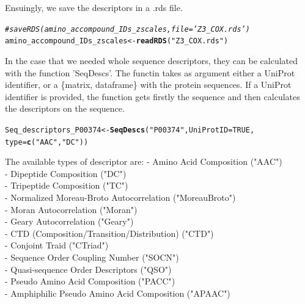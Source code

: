 \documentclass[twoside,a4wide,12pt]{article}\usepackage[]{graphicx}\usepackage[]{color}
\makeatletter
\newcommand{\hlnum}[1]{\textcolor[rgb]{0.686,0.059,0.569}{#1}}%
\newcommand{\hlstr}[1]{\textcolor[rgb]{0.192,0.494,0.8}{#1}}%
\newcommand{\hlcom}[1]{\textcolor[rgb]{0.678,0.584,0.686}{\textit{#1}}}%
\newcommand{\hlstd}[1]{\textcolor[rgb]{0.345,0.345,0.345}{#1}}%
\newcommand{\hlkwb}[1]{\textcolor[rgb]{0.69,0.353,0.396}{#1}}%
\newcommand{\hlkwc}[1]{\textcolor[rgb]{0.333,0.667,0.333}{#1}}%
\newcommand{\hlkwd}[1]{\textcolor[rgb]{0.737,0.353,0.396}{\textbf{#1}}}%
\newenvironment{kframe}{%
 \def\at@end@of@kframe{}%
 \ifinner\ifhmode%
  \def\at@end@of@kframe{\end{minipage}}%
  \begin{minipage}{\columnwidth}%
 \fi\fi%
 \def\FrameCommand##1{\hskip\@totalleftmargin \hskip-\fboxsep
 \colorbox{shadecolor}{##1}\hskip-\fboxsep
     \hskip-\linewidth \hskip-\@totalleftmargin \hskip\columnwidth}%
 \MakeFramed {\advance\hsize-\width
   \@totalleftmargin\z@ \linewidth\hsize
   \@setminipage}}%
 {\par\unskip\endMakeFramed%
 \at@end@of@kframe}
\newenvironment{knitrout}{}{} %
\makeatother
\begin{document}
Ensuingly, we save the descriptors in a .rds file.
\begin{knitrout}
\color{fgcolor}\begin{kframe}
\begin{alltt}
\hlcom{# saveRDS(amino_accompound_IDs_zscales,file='Z3_COX.rds')}
\hlstd{amino_accompound_IDs_zscales} \hlkwb{<-} \hlkwd{readRDS}\hlstd{(}\hlstr{"Z3_COX.rds"}\hlstd{)}
\end{alltt}
\end{kframe}
\end{knitrout}


In the case that we needed whole sequence descriptors, they can be calculated with the function 'SeqDescs'. The functin takes as argument either a UniProt identifier, or a \{matrix, dataframe\} with the protein sequences. If a UniProt identifier is provided, the function gets firstly the sequence and then calculates the descriptors on the sequence.

\begin{knitrout}
\color{fgcolor}\begin{kframe}
\begin{alltt}
\hlstd{Seq_descriptors_P00374} \hlkwb{<-} \hlkwd{SeqDescs}\hlstd{(}\hlstr{"P00374"}\hlstd{,} \hlkwc{UniProtID} \hlstd{=} \hlnum{TRUE}\hlstd{,}
    \hlkwc{type} \hlstd{=} \hlkwd{c}\hlstd{(}\hlstr{"AAC"}\hlstd{,} \hlstr{"DC"}\hlstd{))}
\end{alltt}
\end{kframe}
\end{knitrout}

The available types of descriptor are:\cite{protr}
- Amino Acid Composition ("AAC")\\
- Dipeptide Composition ("DC")\\
- Tripeptide Composition ("TC")\\
- Normalized Moreau-Broto Autocorrelation ("MoreauBroto")\\
- Moran Autocorrelation ("Moran")\\
- Geary Autocorrelation ("Geary")\\
- CTD (Composition/Transition/Distribution) ("CTD")\\
- Conjoint Traid ("CTriad")\\
- Sequence Order Coupling Number ("SOCN")\\
- Quasi-sequence Order Descriptors ("QSO")\\
- Pseudo Amino Acid Composition ("PACC")\\
- Amphiphilic Pseudo Amino Acid Composition ("APAAC")\\
\end{document}
